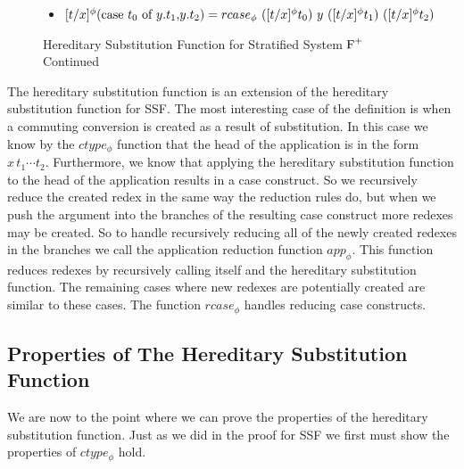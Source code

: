 \begin{figure}
\begin{itemize}
    \item[] $[t/x]^{\phi} (\ccon{t_0}{y}{t_1}{t_2}) = rcase_{\phi}\ ([t/x]^{\phi} t_0)\ y\  ([t/x]^{\phi} t_1)\ ([t/x]^{\phi} t_2)$
  \end{itemize}
  \caption{Hereditary Substitution Function for Stratified System $\mbox{F}^{+}$ Continued}
  \label{fig:hereditary_substitution_function_part2}
\end{figure}
The hereditary substitution function is an extension of the hereditary
substitution function for SSF.  The most interesting case of the
definition is when a commuting conversion is created as a result of
substitution.  In this case we know by the $ctype_\phi$ function that
the head of the application is in the form $x\,t_1 \cdots t_2$.
Furthermore, we know that applying the hereditary substitution
function to the head of the application results in a case construct.
So we recursively reduce the created redex in the same way the
reduction rules do, but when we push the argument into the branches of
the resulting case construct more redexes may be created.  So to
handle recursively reducing all of the newly created redexes in the
branches we call the application reduction function $app_\phi$.  This
function reduces redexes by recursively calling itself and the
hereditary substitution function.  The remaining cases where new
redexes are potentially created are similar to these cases.  The
function $rcase_\phi$ handles reducing case constructs.

\subsection{Properties of The Hereditary Substitution Function}
\label{sec:properties_of_the_hereditary_substitution_function_ssfp}
We are now to the point where we can prove the properties of the
hereditary substitution function.  Just as we did in the proof for SSF
we first must show the properties of $ctype_\phi$ hold.

